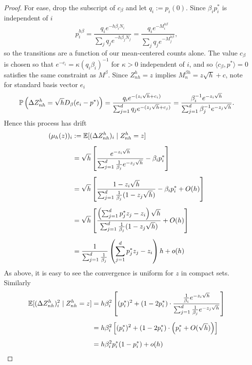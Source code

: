\begin{subappendices}
\begin{proof}
For ease, drop the subscript of $c_\beta$ and let $q_i := p_i(0)$. Since $\beta_i p_i^*$ is independent of $i$
%
\[p^{h\beta}_i = \frac{q_ie^{-h\beta_i N_i}}{\sum_j q_je^{-h\beta_j N_j}} = \frac{q_ie^{-M_i^{h \beta}}}{\sum_j q_je^{-M_j^{h\beta}}},\]
%
\noindent so the transitions are a function of our mean-centered counts alone. The value $c_\beta$ is chosen so that $e^{- c_i} = \kappa (q_i\beta_i)^{-1}$ for $\kappa > 0$ independent of $i$, and so $\langle c_\beta, p^* \rangle = 0$ satisfies the same constraint as $M^\beta$. Since $Z_{nh}^h = z$ implies $M^{\beta h}_n = z\sqrt{h} + c$, note for standard basis vector $e_i$
%
    \[\P\left(\Delta Z_{nh}^h = \sqrt{h}D_\beta (e_i - p^*) \right) = \frac{q_ie^{- (z_i \sqrt{h} + c_i)} }{\sum_{j=1}^d q_je^{- (z_j \sqrt{h} + c_j)}} = \frac{\beta_i^{-1}e^{- z_i \sqrt{h}} }{\sum_{j=1}^d \beta_j^{-1}e^{- z_j \sqrt{h} }}.\]
%
Hence this process has drift
%
\begin{align*}
    (\mu_h(z))_i & := \E [(\Delta Z_{nh}^h)_i \mid Z^h_{nh} = z] \\[5pt]
    & = \sqrt{h} \left[\frac{e^{- z_i \sqrt{h}} }{\sum_{j=1}^d \frac{1}{\beta_j}e^{- z_j \sqrt{h} }} - \beta_ip_i^*\right]\\[5pt]
    & = \sqrt{h} \left[\frac{1- z_i \sqrt{h}}{\sum_{j=1}^d \frac{1}{\beta_j}(1 - z_j \sqrt{h})} - \beta_ip_i^* + O(h)\right]\\[5pt]
    & = \sqrt{h} \left[\frac{\left(\sum_{j=1}^d p_j^*z_j-z_i\right)\sqrt{h}}{\sum_{j=1}^d \frac{1}{\beta_j}(1- z_j \sqrt{h})}  + O(h)\right]\\[5pt]
    & = \frac{1}{\sum_{j=1}^d \frac{1}{\beta_j}} \left(\sum_{j=1}^d p_j^*z_j-z_i\right) h + o(h)
\end{align*}
%
\noindent As above, it is easy to see the convergence is uniform for $z$ in compact sets. Similarly
%
\begin{align*}
     \E [(\Delta Z_{nh}^h)_i^2 \mid Z_{nh}^h = z ] & = h \beta_i^2 \left[(p_i^*)^2 + \left(1-2p_i^* \right) \cdot \frac{\frac{1}{\beta_i}e^{- z_i \sqrt{h}}}{\sum_{j=1}^d \frac{1}{\beta_j}e^{- z_j \sqrt{h}}}\right]\\[5pt]
     & = h\beta_i^2 \left[(p_i^*)^2 + \left(1-2p_i^* \right) \cdot \left(p_i^* + O(\sqrt{h})\right)\right]\\[5pt]
     & = h \beta_i^2  p_i^*(1- p_i^*) + o(h)
\end{align*}


\end{proof}
\end{subappendices}
